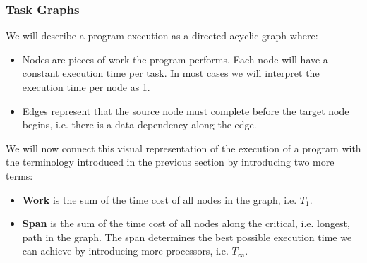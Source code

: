 \documentclass[main.tex]{subfiles}
\begin{document}
\subsubsection{Task Graphs}
We will describe a program execution as a directed acyclic graph where:
\begin{itemize}
    \item Nodes are pieces of work the program performs. Each node will have a constant execution time per task. In most cases we will interpret the execution time per node as 1.
    \item Edges represent that the source node must complete before the target node begins, i.e. there is a data dependency along the edge.
\end{itemize}
We will now connect this visual representation of the execution of a program with the terminology introduced in the previous section by introducing two more terms:
\begin{itemize}
    \item \textbf{Work} is the sum of the time cost of all nodes in the graph, i.e. $T_1$.
    \item  \textbf{Span} is the sum of the time cost of all nodes along the critical, i.e. longest, path in the graph. The span determines the best possible execution time we can achieve by introducing more processors, i.e. $T_\infty$.
\end{itemize}
\end{document}
